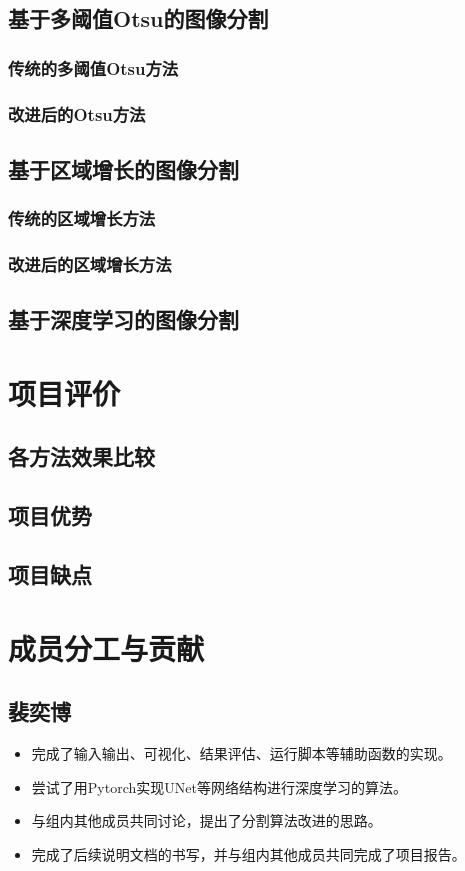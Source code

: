 \documentclass[UTF8]{ctexart}
\begin{document}
\subsection{基于多阈值Otsu的图像分割}
\subsubsection{传统的多阈值Otsu方法}
\subsubsection{改进后的Otsu方法}


\subsection{基于区域增长的图像分割}
\subsubsection{传统的区域增长方法}
\subsubsection{改进后的区域增长方法}

\subsection{基于深度学习的图像分割}


\section{项目评价}
\subsection{各方法效果比较}
\subsection{项目优势}
\subsection{项目缺点}

\section{成员分工与贡献}
\subsection{裴奕博}
\begin{itemize}
    \item 完成了输入输出、可视化、结果评估、运行脚本等辅助函数的实现。
    \item 尝试了用Pytorch实现UNet等网络结构进行深度学习的算法。
    \item 与组内其他成员共同讨论，提出了分割算法改进的思路。
    \item 完成了后续说明文档的书写，并与组内其他成员共同完成了项目报告。
\end{itemize}
\end{document}
